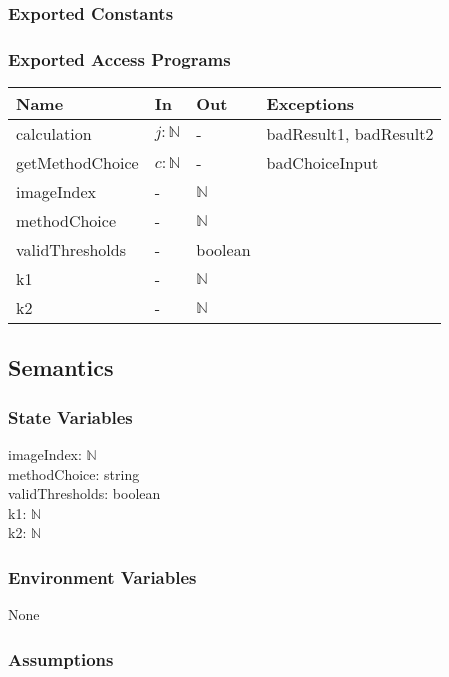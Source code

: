 \documentclass[12pt, titlepage]{article}
\begin{document}
\subsubsection{Exported Constants}

\subsubsection{Exported Access Programs}

\begin{center}
\begin{tabular}{p{4cm} p{2cm} p{2cm} p{6cm}}
\hline
\textbf{Name} & \textbf{In} & \textbf{Out} & \textbf{Exceptions} \\
\hline
calculation & $j: \mathbb{N}$ & - & badResult1, badResult2\\
getMethodChoice & $c: \mathbb{N}$ & - & badChoiceInput \\
imageIndex & - & $\mathbb{N}$ &  \\
methodChoice & - & $\mathbb{N}$ &  \\
validThresholds & - & boolean &\\
k1 & - & $\mathbb{N}$ &  \\
k2 & - & $\mathbb{N}$ &  \\
\hline
\end{tabular}
\end{center}

\subsection{Semantics}

\subsubsection{State Variables}

imageIndex: $\mathbb{N}$\\
methodChoice: string\\
validThresholds: boolean\\
k1: $\mathbb{N}$\\
k2: $\mathbb{N}$

\subsubsection{Environment Variables}

None

\subsubsection{Assumptions}
\end{document}
